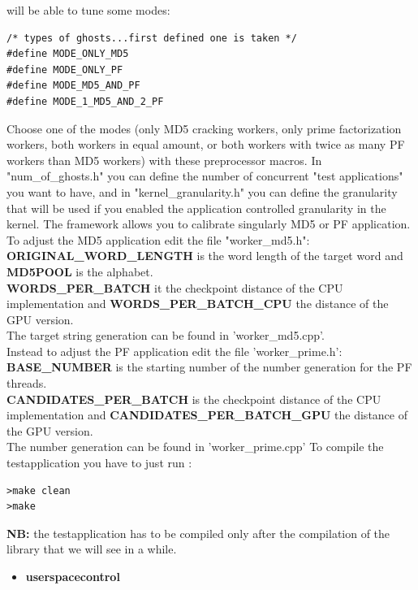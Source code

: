 \documentclass[a4paper,13pt]{article}
\begin{document}
\begin{multicols}{2}
        will be able to tune some modes:
        \begin{lstlisting}
/* types of ghosts...first defined one is taken */
#define MODE_ONLY_MD5
#define MODE_ONLY_PF
#define MODE_MD5_AND_PF
#define MODE_1_MD5_AND_2_PF
        \end{lstlisting}
        Choose one of the modes (only MD5 cracking workers, only prime factorization workers, both workers in 
        equal amount, or both workers with twice as many PF workers than MD5 workers) with these preprocessor
        macros. In "num\_of\_ghosts.h" you can define the number of concurrent "test applications" you want to
        have, and in "kernel\_granularity.h" you can define the granularity that will be used if you enabled
        the application controlled granularity in the kernel.
        The framework allows you to calibrate singularly MD5 or PF application.
        To adjust the MD5 application edit the file "worker\_md5.h":\\
        {\bf ORIGINAL\_WORD\_LENGTH} is the word length of the target word and {\bf MD5POOL} is the alphabet.\\
        {\bf WORDS\_PER\_BATCH} it the checkpoint distance of the CPU implementation and {\bf WORDS\_PER\_BATCH\_CPU}
        the distance of the GPU version.\\
        The target string generation can be found in 'worker\_md5.cpp'.\\
        Instead to adjust the PF application edit the file 'worker\_prime.h':\\
        {\bf BASE\_NUMBER} is the starting number of the number generation for the PF threads.\\
        {\bf CANDIDATES\_PER\_BATCH} is the checkpoint distance of the CPU implementation and {\bf CANDIDATES\_PER\_BATCH\_GPU} 
        the distance of the GPU version.\\
        The number generation can be found in 'worker\_prime.cpp' 
        \newline
        To compile the testapplication you have to just run :
        \begin{lstlisting}
>make clean
>make 
        \end{lstlisting}
        {\bf NB:} the testapplication has to be compiled only after the compilation of the library that we will see
        in a while.
    \vspace{4ex}
    \begin{itemize}
        \item{{\bf userspacecontrol}}\\

\end{itemize}
\end{multicols}
\end{document}
